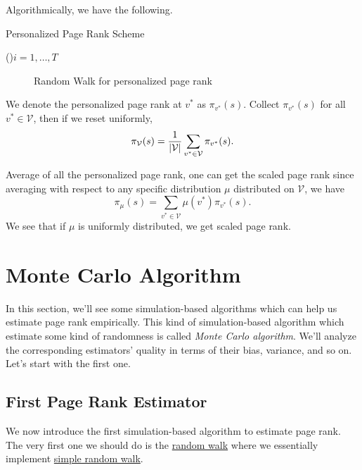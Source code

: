 Algorithmically, we have the following.
\par
\begin{algorithm}[H]\label{algo:personalized-page-rank-scheme}
	\DontPrintSemicolon
	\caption{Personalized Page Rank Scheme}
	\BlankLine

	\For(){\(i = 1, \ldots, T\)}{
	}
	\Return{}\;
\end{algorithm}
\begin{figure}[H]
	\centering
	\caption{Random Walk for personalized page rank}
	\label{fig:personalized-pagerank}
\end{figure}

We denote the personalized page rank at \(v^{\ast} \) as \(\pi_{v^{\ast}}(s)\). Collect \(\pi_{v^{\ast}}(s)\) for all \(v^{\ast}\in\mathcal{V}\),
then if we reset uniformly,
\[
	\pi_{\mathcal{\MakeUppercase{v}}} (s) = \frac{1}{\left\vert \mathcal{\MakeUppercase{v}} \right\vert }\sum\limits_{v^{\ast}\in\mathcal{V}} \pi_{v^{\ast}}(s).
\]

\begin{remark}
	Average of all the personalized page rank, one can get the scaled page rank
	since averaging with respect to any specific distribution \(\mu\) distributed on \(\mathcal{V}\), we have
	\[
		\pi_\mu(s) = \sum\limits_{v^{\ast}\in \mathcal{V}} \mu(v^{\ast})\pi_{v^{\ast}}(s).
	\]
	We see that if \(\mu\) is uniformly distributed, we get scaled page rank.
\end{remark}

\section{Monte Carlo Algorithm}
In this section, we'll see some simulation-based algorithms which can help us estimate page rank empirically. This kind of simulation-based algorithm which
estimate some kind of randomness is called \emph{Monte Carlo algorithm}. We'll analyze the corresponding estimators' quality in terms of their bias, variance,
and so on. Let's start with the first one.

\subsection{First Page Rank Estimator}
We now introduce the first simulation-based algorithm to estimate page rank. The very first one we should do is the \hyperref[algo:random-walk-algorithm]{random walk}
where we essentially implement \hyperref[def:simple-random-walk]{simple random walk}.


